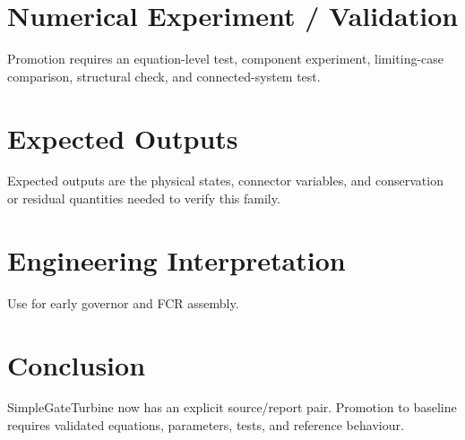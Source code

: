 \documentclass[10pt,a4paper]{article}
\begin{document}
\section{Numerical Experiment / Validation}Promotion requires an equation-level test, component experiment, limiting-case comparison, structural check, and connected-system test.
\section{Expected Outputs}Expected outputs are the physical states, connector variables, and conservation or residual quantities needed to verify this family.
\section{Engineering Interpretation}Use for early governor and FCR assembly.
\section*{Conclusion}SimpleGateTurbine now has an explicit source/report pair. Promotion to baseline requires validated equations, parameters, tests, and reference behaviour.
\end{document}
